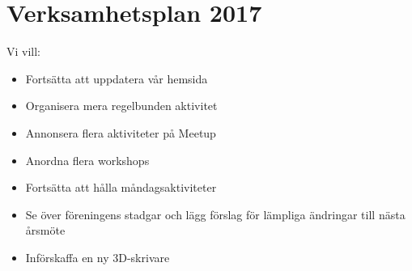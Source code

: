 \documentclass[a4paper,11pt,oneside]{article}
\begin{document}
\section{Verksamhetsplan 2017}

Vi vill: \\
\begin{itemize}
\item Fortsätta att uppdatera vår hemsida
\item Organisera mera regelbunden aktivitet
\item Annonsera flera aktiviteter på Meetup
\item Anordna flera workshops
\item Fortsätta att hålla måndagsaktiviteter
\item Se över föreningens stadgar och lägg förslag för lämpliga ändringar till nästa årsmöte
\item Införskaffa en ny 3D-skrivare
\end{itemize}
\end{document}
